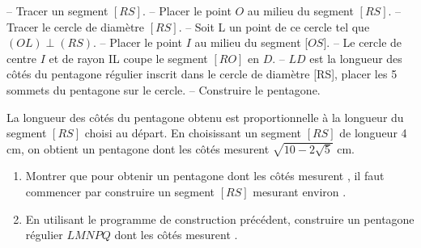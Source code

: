 \begin{enumerate}
\begin{center}
{\begin{minipage}{11cm}
                  -- Tracer un segment $[RS]$. \newline
                  -- Placer le point $O$ au milieu du segment $[RS]$. \newline
                  -- Tracer le cercle de diamètre $[RS]$. \newline
                  -- Soit L un point de ce cercle tel que $(OL)\perp(RS)$. \newline
                  -- Placer le point $I$ au milieu du segment [$OS]$. \newline
                  -- Le cercle de centre $I$ et de rayon IL coupe le segment $[RO]$ en $D$. \newline
                  -- $LD$ est la longueur des côtés du pentagone régulier inscrit dans le cercle de diamètre $[$RS], placer les 5 sommets du pentagone sur le cercle. \newline
                  -- Construire le pentagone.
               \end{minipage}}
         \end{center}
         La longueur des côtés du pentagone obtenu est proportionnelle à la longueur du segment $[RS]$ choisi au départ. En choisissant un segment $[RS]$ de longueur 4 cm, on obtient un pentagone dont les côtés mesurent $\sqrt{10-2\sqrt5}$ cm.
         \begin{enumerate}
            \item Montrer que pour obtenir un pentagone dont les côtés mesurent , il faut commencer par construire un segment $[RS]$ mesurant environ .
            \item En utilisant le programme de construction précédent, construire un pentagone régulier $LMNPQ$ dont les côtés mesurent .
         \end{enumerate}
      \end{enumerate}

